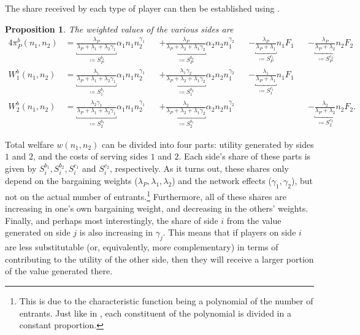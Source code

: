 \documentclass[a4paper]{article}
\newtheorem{proposition}{Proposition}
\begin{document}
The share received by each type of player can then be established using .
\begin{proposition}
    \label{prop:bargaining_entry_fees}
    The weighted values of the various sides are
    \begin{alignat*}{4}
        \pi_P^b(n_1, n_2) &= \underbracket{\frac{\lambda_P}{\lambda_P + \lambda_1 + \lambda_2\gamma_1}}_{\coloneqq S_P^{b_1}} \alpha_1 n_1 n_2^{\gamma_1} &&+ \underbracket{\frac{\lambda_P}{\lambda_P + \lambda_2 + \lambda_1\gamma_2}}_{\coloneqq S_P^{b_2}} \alpha_2 n_2 n_1^{\gamma_2} &&- \underbracket{\frac{\lambda_P}{\lambda_P + \lambda_1}}_{\coloneqq S_P^{c_1}} n_1 F_1 &&- \underbracket{\frac{\lambda_P}{\lambda_P + \lambda_2}}_{\coloneqq S_P^{c_2}} n_2 F_2 \\
        W_1^b(n_1, n_2) &= \underbracket{\frac{\lambda_1}{\lambda_P + \lambda_1 + \lambda_2\gamma_1}}_{\coloneqq S_1^{b_1}} \alpha_1 n_1 n_2^{\gamma_1} &&+ \underbracket{\frac{\lambda_1 \gamma_2}{\lambda_P + \lambda_2 + \lambda_1\gamma_2}}_{\coloneqq S_1^{b_2}}  \alpha_2 n_2 n_1^{\gamma_2} &&- \underbracket{\frac{\lambda_1}{\lambda_P + \lambda_1}}_{\coloneqq S_1^{c_1}} n_1 F_1 && \\
        W_2^b(n_1, n_2) &= \underbracket{\frac{\lambda_2\gamma_1}{\lambda_P + \lambda_1 + \lambda_2\gamma_1}}_{\coloneqq S_2^{b_1}} \alpha_1 n_1 n_2^{\gamma_1} &&+ \underbracket{\frac{\lambda_2}{\lambda_P + \lambda_2 + \lambda_1\gamma_2}}_{\coloneqq S_2^{b_1}} \alpha_2 n_2 n_1^{\gamma_2} && &&- \underbracket{\frac{\lambda_2}{\lambda_P + \lambda_2}}_{\coloneqq S_2^{c_2}} n_2 F_2.
    \end{alignat*}
\end{proposition}

Total welfare $w(n_1, n_2)$ can be divided into four parts: utility generated by sides $1$ and $2$, and the costs of serving sides $1$ and $2$.
Each side's share of these parts is given by $S_i^{b_1}, S_i^{b_2}, S_i^{c_1}$ and $S_i^{c_2}$, respectively.
As it turns out, these shares only depend on the bargaining weights ($\lambda_P, \lambda_1, \lambda_2$) and the network effects ($\gamma_1, \gamma_2$), but not on the actual number of entrants.\footnote{
    This is due to the characteristic function being a polynomial of the number of entrants.
    Just like in , each constituent of the polynomial is divided in a constant proportion.
}
Furthermore, all of these shares are increasing in one's own bargaining weight, and decreasing in the others' weights.
Finally, and perhaps most interestingly, the share of side $i$ from the value generated on side $j$ is also increasing in $\gamma_j$.
This means that if players on side $i$ are less substitutable (or, equivalently, more complementary) in terms of contributing to the utility of the other side, then they will receive a larger portion of the value generated there.
\end{document}
